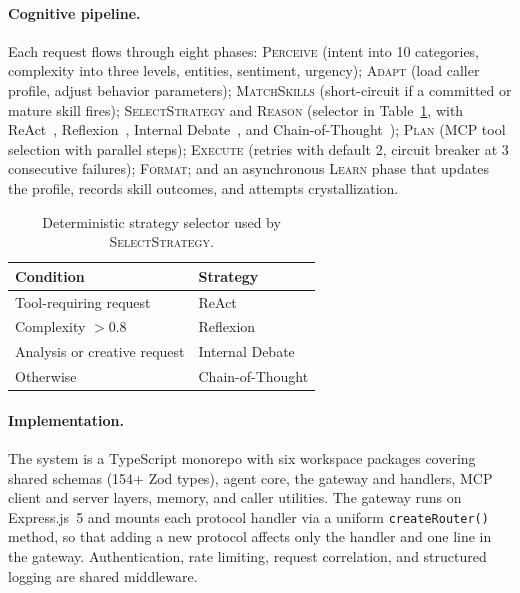 \documentclass[11pt]{article}
\begin{document}
\paragraph{Cognitive pipeline.}
Each request flows through eight phases: \textsc{Perceive} (intent into 10 categories, complexity into three levels, entities, sentiment, urgency); \textsc{Adapt} (load caller profile, adjust behavior parameters); \textsc{MatchSkills} (short-circuit if a committed or mature skill fires); \textsc{SelectStrategy} and \textsc{Reason} (selector in Table~\ref{tab:strategy}, with ReAct~\citep{yao2023react}, Reflexion~\citep{shinn2023reflexion}, Internal Debate~\citep{du2023debate}, and Chain-of-Thought~\citep{wei2022chain}); \textsc{Plan} (MCP tool selection with parallel steps); \textsc{Execute} (retries with default 2, circuit breaker at 3 consecutive failures); \textsc{Format}; and an asynchronous \textsc{Learn} phase that updates the profile, records skill outcomes, and attempts crystallization.

\begin{table}[t]
  \small
  \centering
  \begin{tabular}{ll}
    \toprule
    Condition & Strategy \\
    \midrule
    Tool-requiring request          & ReAct \\
    Complexity $> 0.8$              & Reflexion \\
    Analysis or creative request    & Internal Debate \\
    Otherwise                       & Chain-of-Thought \\
    \bottomrule
  \end{tabular}
  \caption{Deterministic strategy selector used by \textsc{SelectStrategy}.}
  \label{tab:strategy}
\end{table}

\paragraph{Implementation.}
The system is a TypeScript monorepo with six workspace packages covering shared schemas (154+ Zod types), agent core, the gateway and handlers, MCP client and server layers, memory, and caller utilities. The gateway runs on Express.js~5 and mounts each protocol handler via a uniform \texttt{createRouter()} method, so that adding a new protocol affects only the handler and one line in the gateway. Authentication, rate limiting, request correlation, and structured logging are shared middleware.
\end{document}
